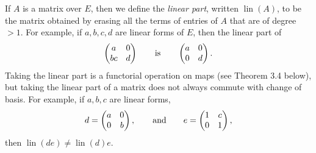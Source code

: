 \documentclass{tran-l}
\newcommand{\lin}{\operatorname{lin}}
\theoremstyle{plain}
\theoremstyle{remark}
\theoremstyle{definition}
\begin{document}
If $A$ is a matrix over $E$, then we define the {\em linear part\/},
written $\lin (A)$, to be the matrix obtained by erasing all the terms
of entries of $A$ that are of degree $>1$.  For example, if
$a,b,c,d$ are linear forms of $E$, then
the linear part of
\begin{equation*}\begin{pmatrix}a&0\\
bc&d
\end{pmatrix}
\qquad \hbox {is}\qquad \begin{pmatrix}a& 0\\
0&d\end{pmatrix}
.
\end{equation*}
Taking the linear part is a functorial operation
on maps (see Theorem 3.4 below), but
taking the linear part of a matrix does not
always commute with change of basis.
For example, if $a,b,c$ are linear
forms,
\begin{equation*}d=\begin{pmatrix}a & 0 \\
0 & b
\end{pmatrix}
,
\qquad \hbox {and}\qquad e=\begin{pmatrix}1 & c \\
               0 & 1
\end{pmatrix}
, \end{equation*}
then
$\lin (de) \neq \lin (d)e. $
\end{document}
